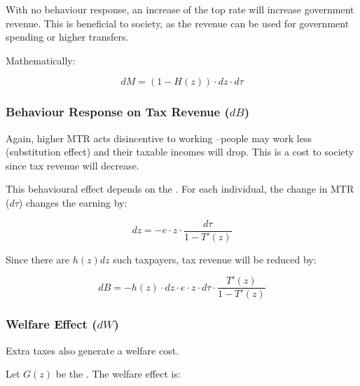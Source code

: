             With no behaviour response, an increase of the top rate will increase government revenue. This is beneficial to society, as the revenue can be used for government spending or higher transfers.

            Mathematically:

            \begin{equation}
                dM = (1-H(z)) \cdot dz \cdot d\tau
                \label{eqn:tax_gen_TR}
            \end{equation}

        \subsubsection{Behaviour Response on Tax Revenue ($dB$)}

            Again, higher MTR acts disincentive to working --people may work less (substitution effect) and their taxable incomes will drop. This is a cost to society since tax revenue will decrease.

            This behavioural effect depends on the . For each individual, the change in MTR ($d\tau$) changes the earning by:

            \begin{equation*}
                dz = -e \cdot z \cdot \frac{d\tau}{1-T'(z)}
            \end{equation*}

            Since there are $h(z)dz$ such taxpayers, tax revenue will be reduced by:

            \begin{equation}
                dB = - h(z) \cdot dz \cdot e \cdot z \cdot d\tau \cdot \frac{T'(z)}{1-T'(z)}
                \label{eqn:tax_gen_BR}
            \end{equation}

        \subsubsection{Welfare Effect ($dW$)}

            Extra taxes also generate a welfare cost.

            Let $G(z)$ be the . The welfare effect is:

